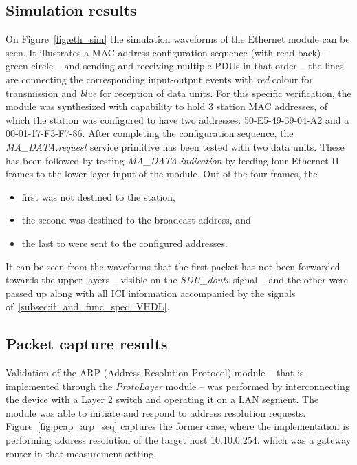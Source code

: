 \documentclass[conference]{IEEEtran}
\begin{document}
\subsection{Simulation results}

On Figure~\ref{fig:eth_sim} the simulation waveforms of the Ethernet module can be seen. It illustrates a MAC address
configuration sequence (with read-back) -- green circle -- and sending and receiving multiple PDUs in that order -- the
lines are connecting the corresponding input-output events with \emph{red} colour for transmission and \emph{blue} for
reception of data units. For this specific verification, the module was synthesized with capability to hold 3 station
MAC addresses, of which the station was configured to have two addresses: 50-E5-49-39-04-A2 and a 00-01-17-F3-F7-86.
After completing the configuration sequence, the \emph{MA\_DATA.request} service primitive has been tested with two
data units. These has been followed by testing \emph{MA\_DATA.indication} by feeding four Ethernet II frames to the
lower layer input of the module. Out of the four frames, the
\begin{itemize}
    \renewcommand \labelitemi{--}
    \item first was not destined to the station,
    \item the second was destined to the broadcast address, and
    \item the last to were sent to the configured addresses.
\end{itemize}
It can be seen from the waveforms that the first packet has not been forwarded towards the upper layers -- visible on
the \emph{SDU\_doutv} signal -- and the other were passed up along with all ICI information accompanied by the signals of~\ref{subsec:if_and_func_spec_VHDL}.

\subsection{Packet capture results}

Validation of the ARP (Address Resolution Protocol) module -- that is implemented through the \emph{ProtoLayer} module
-- was performed by interconnecting the device with a Layer 2 switch and operating it on a LAN segment. The module was
able to initiate and respond to address resolution requests. Figure~\ref{fig:pcap_arp_seq} captures the former case,
where the implementation is performing address resolution of the target host 10.10.0.254. which was a gateway router in
that measurement setting.
\end{document}
